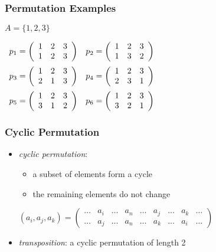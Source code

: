 \documentclass[dvipsnames]{beamer}
\begin{document}
\begin{frame}
  \frametitle{Permutation Examples}

  \begin{example}
    $A = \{1,2,3\}$

    \medskip
    $\begin{array}{cc}
      p_1 = \left(
        \begin{array}{ccc}
          1 & 2 & 3\\
          1 & 2 & 3
        \end{array}
      \right) &
      p_2 = \left(
        \begin{array}{ccc}
          1 & 2 & 3\\
          1 & 3 & 2
        \end{array}
      \right)\medskip\\
      p_3 = \left(
        \begin{array}{ccc}
          1 & 2 & 3\\
          2 & 1 & 3
        \end{array}
      \right) &
      p_4 = \left(
        \begin{array}{ccc}
          1 & 2 & 3\\
          2 & 3 & 1
        \end{array}
      \right)\medskip\\
      p_5 = \left(
        \begin{array}{ccc}
          1 & 2 & 3\\
          3 & 1 & 2
        \end{array}
      \right) &
      p_6 = \left(
        \begin{array}{ccc}
          1 & 2 & 3\\
          3 & 2 & 1
        \end{array}
      \right)
    \end{array}$
  \end{example}
\end{frame}

\begin{frame}
  \frametitle{Cyclic Permutation}

  \begin{itemize}
    \item \emph{cyclic permutation}:
    \begin{itemize}
      \item a subset of elements form a cycle
      \item the remaining elements do not change
    \end{itemize}

    \pause
    \medskip
    $(a_i, a_j, a_k) = \left(
      \begin{array}{ccccccccc}
      \dots & a_i & \dots & a_n & \dots & a_j & \dots & a_k & \dots\\
      \dots & a_j & \dots & a_n & \dots & a_k & \dots & a_i & \dots
      \end{array}
    \right)$

    \pause
    \bigskip
    \item \emph{transposition}: a cyclic permutation of length 2
  \end{itemize}
\end{frame}
\end{document}
